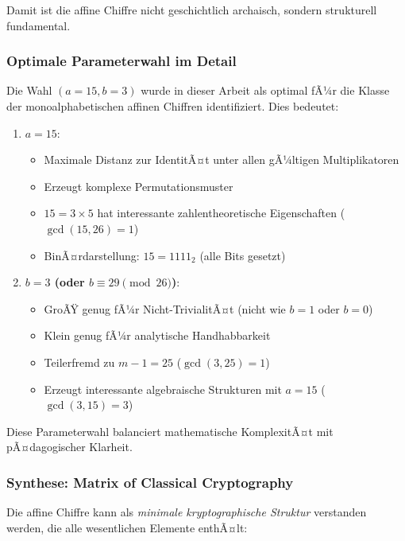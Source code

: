 ﻿\documentclass[12pt,a4paper]{article}
\begin{document}
	Damit ist die affine Chiffre nicht geschichtlich archaisch, sondern strukturell fundamental.
	
	\subsubsection{Optimale Parameterwahl im Detail}
	
	Die Wahl $(a=15, b=3)$ wurde in dieser Arbeit als optimal fÃ¼r die Klasse der monoalphabetischen affinen Chiffren identifiziert. Dies bedeutet:
	
	\begin{enumerate}
		\item \textbf{$a = 15$}: 
		\begin{itemize}
			\item Maximale Distanz zur IdentitÃ¤t unter allen gÃ¼ltigen Multiplikatoren
			\item Erzeugt komplexe Permutationsmuster
			\item $15 = 3 \times 5$ hat interessante zahlentheoretische Eigenschaften ($\gcd(15, 26) = 1$)
			\item BinÃ¤rdarstellung: $15 = 1111_2$ (alle Bits gesetzt)
		\end{itemize}
		
		\item \textbf{$b = 3$ (oder $b \equiv 29 \pmod{26}$)}:
		\begin{itemize}
			\item GroÃŸ genug fÃ¼r Nicht-TrivialitÃ¤t (nicht wie $b = 1$ oder $b = 0$)
			\item Klein genug fÃ¼r analytische Handhabbarkeit
			\item Teilerfremd zu $m - 1 = 25$ ($\gcd(3, 25) = 1$)
			\item Erzeugt interessante algebraische Strukturen mit $a = 15$ ($\gcd(3, 15) = 3$)
		\end{itemize}
	\end{enumerate}
	
	Diese Parameterwahl balanciert mathematische KomplexitÃ¤t mit pÃ¤dagogischer Klarheit.
	
	\subsubsection{Synthese: Matrix of Classical Cryptography}
	
	Die affine Chiffre kann als \textit{minimale kryptographische Struktur} verstanden werden, die alle wesentlichen Elemente enthÃ¤lt:
	
\end{document}
